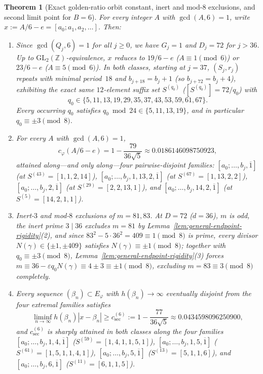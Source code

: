 \documentclass[11pt]{amsart}
\newtheorem{theorem}{Theorem}[section]
\theoremstyle{definition}
\theoremstyle{remark}
\numberwithin{equation}{section}
\newcommand{\Z}{\mathbb{Z}}
\begin{document}
\begin{theorem}[Exact golden-ratio orbit constant, inert and mod-$8$ exclusions, and second limit point for $B=6$]\label{thm:golden-b6-exact}
For every integer $A$ with $\gcd(A,6)=1$, write $x:=A/6-e=[a_0;a_1,a_2,\ldots]$. Then:
\begin{enumerate}
\item Since $\gcd(Q_j,6)=1$ for all $j\ge0$, we have $G_j=1$ and $D_j=72$ for
      $j>36$. Up to $\mathrm{GL}_2(\Z)$-equivalence, $x$ reduces to $19/6-e$
      ($A\equiv1\pmod6$) or $23/6-e$ ($A\equiv5\pmod6$). In both classes,
      starting at $j=37$, $(S_j,r_j)$ repeats with minimal period~$18$ and
      $b_{j+18}=b_j+1$ (so $b_{j+72}=b_j+4$), exhibiting the exact same
      $12$-element suffix set $S^{(q_0)}$ ($[S^{(q_0)}]=72/q_0$) with
      \[
       q_0\in\{5,11,13,19,29,35,37,43,53,59,61,67\}.
      \]
      Every occurring $q_0$ satisfies $q_0\bmod24\in\{5,11,13,19\}$, and in
      particular $q_0\equiv\pm3\pmod8$.
\item For every $A$ with $\gcd(A,6)=1$,
      \[
       c_\varphi(A/6-e)=1-\frac{79}{36\sqrt5}\approx 0.0186146098750923,
      \]
      attained along---and only along---four pairwise-disjoint families:
      $[a_0;\ldots,b_j,\overline1]$ (at $S^{(43)}=[1,1,2,14]$),
      $[a_0;\ldots,b_j,1,13,2,\overline1]$ (at $S^{(67)}=[1,13,2,2]$),
      $[a_0;\ldots,b_j,2,\overline1]$ (at $S^{(29)}=[2,2,13,1]$), and
      $[a_0;\ldots,b_j,14,2,\overline1]$ (at $S^{(5)}=[14,2,1,1]$).
\item \emph{Inert-$3$ and mod-$8$ exclusions of $m=81,83$.} At $D=72$ ($d=36$),
      $m$ is odd, the inert prime $3\mid36$ excludes $m=81$ by
      Lemma~\ref{lem:general-endpoint-rigidity}(2), and since
      $83^2-5\cdot36^2=409\equiv1\pmod8$ is prime, every divisor
      $N(\gamma)\in\{\pm1,\pm409\}$ satisfies $N(\gamma)\equiv\pm1\pmod8$;
      together with $q_0\equiv\pm3\pmod8$, Lemma~\ref{lem:general-endpoint-rigidity}(3)
      forces $m\equiv36-\varepsilon q_0N(\gamma)\equiv4\pm3\equiv\pm1\pmod8$,
      excluding $m=83\equiv3\pmod8$ completely.
\item Every sequence $(\beta_n)\subset E_\varphi$ with $h(\beta_n)\to\infty$
      eventually disjoint from the four extremal families satisfies
      \[
       \liminf_{n\to\infty}h(\beta_n)|x-\beta_n|\ge
       c_{\mathrm{sec}}^{(6)}:=1-\frac{77}{36\sqrt5}\approx 0.0434598096250900,
      \]
      and $c_{\mathrm{sec}}^{(6)}$ is sharply attained in both classes along the
      four families $[a_0;\ldots,b_j,1,4,\overline1]$ ($S^{(59)}=[1,4,1,1,5,1]$),
      $[a_0;\ldots,b_j,1,5,\overline1]$ ($S^{(61)}=[1,5,1,1,4,1]$),
      $[a_0;\ldots,b_j,5,\overline1]$ ($S^{(13)}=[5,1,1,6]$), and
      $[a_0;\ldots,b_j,6,\overline1]$ ($S^{(11)}=[6,1,1,5]$).
\end{enumerate}
\end{theorem}
\end{document}

